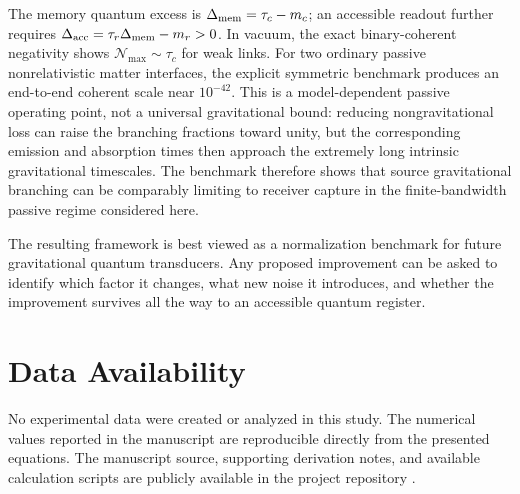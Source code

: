 The memory quantum excess is $\Delta_{\rm mem}=\tau_c-m_c$; an accessible readout further requires $\Delta_{\rm acc}=\tau_r\Delta_{\rm mem}-m_r>0$. In vacuum, the exact binary-coherent negativity shows $\mathcal N_{\max}\sim\tau_c$ for weak links. For two ordinary passive nonrelativistic matter interfaces, the explicit symmetric benchmark produces an end-to-end coherent scale near $10^{-42}$. This is a model-dependent passive operating point, not a universal gravitational bound: reducing nongravitational loss can raise the branching fractions toward unity, but the corresponding emission and absorption times then approach the extremely long intrinsic gravitational timescales. The benchmark therefore shows that source gravitational branching can be comparably limiting to receiver capture in the finite-bandwidth passive regime considered here.

The resulting framework is best viewed as a normalization benchmark for future gravitational quantum transducers. Any proposed improvement can be asked to identify which factor it changes, what new noise it introduces, and whether the improvement survives all the way to an accessible quantum register.

\section*{Data Availability}

No experimental data were created or analyzed in this study. The numerical values reported in the manuscript are reproducible directly from the presented equations. The manuscript source, supporting derivation notes, and available calculation scripts are publicly available in the project repository \cite{GedankenRepo2026}.
